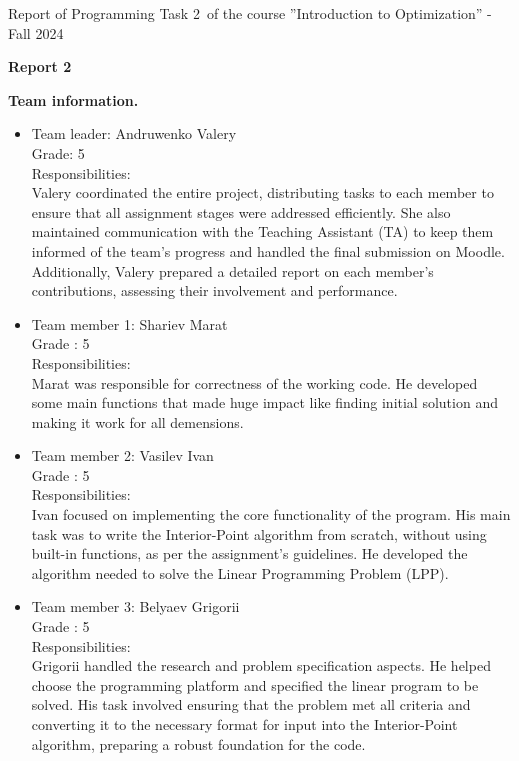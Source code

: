 \documentclass[12pt, legalpaper]{exam}
\newcommand{\course}{Introduction to Optimization}
\newcommand{\term}{Fall 2024}
\newcommand{\examnum}{Report of Programming Task 2}
\begin{document}
\noindent \examnum \, of the  course ''\course'' - \term


\noindent
{}




\vspace{12pt}
\begin{center}
    \textbf{Report 2}
\end{center}

\vspace{12pt}

\noindent  \textbf{Team information.}

\begin{itemize}
    \item Team leader: Andruwenko Valery 
    \\Grade: 5
    \\ Responsibilities:
    \\Valery coordinated the entire project, distributing tasks to each member to ensure that all assignment stages were addressed efficiently. She also maintained communication with the Teaching Assistant (TA) to keep them informed of the team’s progress and handled the final submission on Moodle. Additionally, Valery prepared a detailed report on each member's contributions, assessing their involvement and performance.
    \item Team member 1: Shariev Marat 
    \\Grade : 5
    \\ Responsibilities:
    \\Marat was responsible for correctness of the working code. He developed some main functions that made huge impact like finding initial solution and making it work for all demensions. 
    \item Team member 2: Vasilev Ivan
    \\ Grade : 5
    \\Responsibilities:
    \\Ivan focused on implementing the core functionality of the program. His main task was to write the Interior-Point algorithm from scratch, without using built-in functions, as per the assignment’s guidelines. He developed the algorithm needed to solve the Linear Programming Problem (LPP).
    \item Team member 3: Belyaev Grigorii
    \\ Grade : 5
    \\Responsibilities:
    \\Grigorii handled the research and problem specification aspects. He helped choose the programming platform and specified the linear program to be solved. His task involved ensuring that the problem met all criteria and converting it to the necessary format for input into the Interior-Point algorithm, preparing a robust foundation for the code.
\end{itemize}
\end{document}
